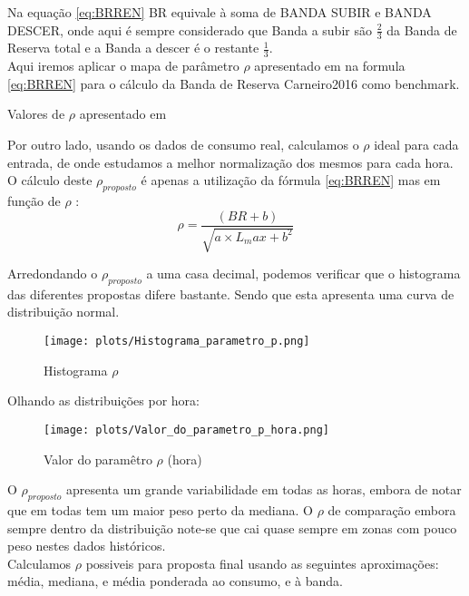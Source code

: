 Na equação \ref{eq:BRREN} BR equivale à soma de BANDA SUBIR e BANDA DESCER, onde aqui é sempre considerado que Banda a subir são $\frac{2}{3}$ da Banda de Reserva total e a Banda a descer é o restante $\frac{1}{3}$. \\
Aqui iremos aplicar o mapa de parâmetro $\rho$ apresentado em \cite{Carneiro2016} na formula \ref{eq:BRREN} para o cálculo da Banda de Reserva Carneiro2016 como benchmark. \\

\begin{table}[H] \centering \caption{Valores de $\rho$ apresentado em \cite{Carneiro2016}}  \end{table}


Por outro lado, usando os dados de consumo real, calculamos o $\rho$ ideal para cada entrada, de onde estudamos a melhor normalização dos mesmos para cada hora. \\
O cálculo deste $\rho_{proposto}$ é apenas a utilização da fórmula \ref{eq:BRREN} mas em função de $\rho$ : \\

\begin{equation} \label{eq:rhoproposed} 
    \rho  = \frac{(BR + b)}{\sqrt{a \times L_max + b^{2}}}
\end{equation}


Arredondando o $\rho_{proposto}$ a uma casa decimal, podemos verificar que o histograma das diferentes propostas difere bastante. Sendo que esta apresenta uma curva de distribuição normal. \\


\begin{figure}[H]
    \centering
    \texttt{[image: plots/Histograma\_parametro\_p.png]}
    \caption{Histograma $\rho$}
  \end{figure}


Olhando as distribuições por hora: \\

\begin{figure}[H]
    \centering
    \texttt{[image: plots/Valor\_do\_parametro\_p\_hora.png]}
    \caption{Valor do paramêtro $\rho$ (hora)}
  \end{figure}

O $\rho_{proposto}$ apresenta um grande variabilidade em todas as horas, embora de notar que em todas tem um maior peso perto da mediana. O $\rho$ de comparação embora sempre dentro da distribuição note-se que cai quase sempre em zonas com pouco peso nestes dados históricos. \\
Calculamos $\rho$ possiveis para proposta final usando as seguintes aproximações: média, mediana, e média ponderada ao consumo, e à banda. \\

